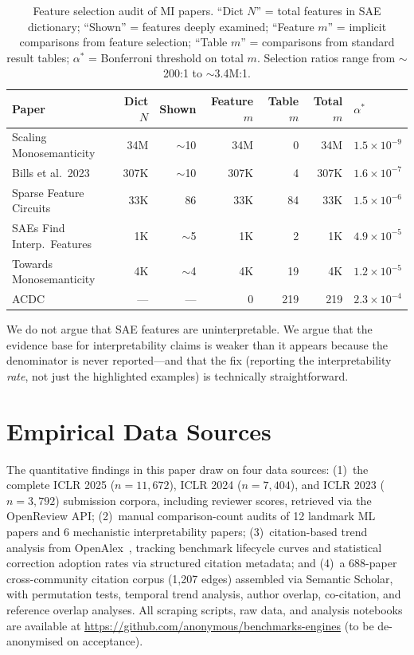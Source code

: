 \documentclass{article}
\begin{document}
\begin{table}[h]
\centering
\caption{Feature selection audit of MI papers. ``Dict $N$'' = total features in SAE dictionary; ``Shown'' = features deeply examined; ``Feature $m$'' = implicit comparisons from feature selection; ``Table $m$'' = comparisons from standard result tables; $\alpha^*$ = Bonferroni threshold on total $m$. Selection ratios range from $\sim$200:1 to $\sim$3.4M:1.}
\label{tab:mi_audit}
\small
\begin{tabular}{@{}lrrrrrl@{}}
\toprule
Paper & Dict $N$ & Shown & Feature $m$ & Table $m$ & Total $m$ & $\alpha^*$ \\
\midrule
Scaling Monosemanticity & 34M & $\sim$10 & 34M & 0 & 34M & $1.5 \times 10^{-9}$ \\
Bills et al.\ 2023 & 307K & $\sim$10 & 307K & 4 & 307K & $1.6 \times 10^{-7}$ \\
Sparse Feature Circuits & 33K & 86 & 33K & 84 & 33K & $1.5 \times 10^{-6}$ \\
SAEs Find Interp.\ Features & 1K & $\sim$5 & 1K & 2 & 1K & $4.9 \times 10^{-5}$ \\
Towards Monosemanticity & 4K & $\sim$4 & 4K & 19 & 4K & $1.2 \times 10^{-5}$ \\
ACDC & --- & --- & 0 & 219 & 219 & $2.3 \times 10^{-4}$ \\
\bottomrule
\end{tabular}
\end{table}

We do not argue that SAE features are uninterpretable. We argue that the evidence base for interpretability claims is weaker than it appears because the denominator is never reported---and that the fix (reporting the interpretability \textit{rate}, not just the highlighted examples) is technically straightforward.

\section{Empirical Data Sources}
\label{app:data}

The quantitative findings in this paper draw on four data sources: (1)~the complete ICLR 2025 ($n = 11{,}672$), ICLR 2024 ($n = 7{,}404$), and ICLR 2023 ($n = 3{,}792$) submission corpora, including reviewer scores, retrieved via the OpenReview API; (2)~manual comparison-count audits of 12 landmark ML papers and 6 mechanistic interpretability papers; (3)~citation-based trend analysis from OpenAlex~\citep{priem_openalex_2022}, tracking benchmark lifecycle curves and statistical correction adoption rates via structured citation metadata; and (4)~a 688-paper cross-community citation corpus (1,207 edges) assembled via Semantic Scholar, with permutation tests, temporal trend analysis, author overlap, co-citation, and reference overlap analyses. All scraping scripts, raw data, and analysis notebooks are available at \url{https://github.com/anonymous/benchmarks-engines} (to be de-anonymised on acceptance).
\end{document}

